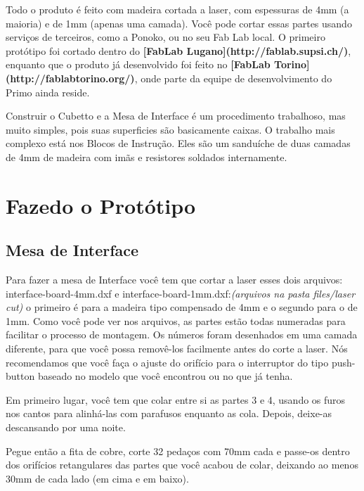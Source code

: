 \documentclass[paper=a4, fontsize=11pt]{scrartcl} %
\numberwithin{equation}{section} %
\numberwithin{figure}{section} %
\numberwithin{table}{section} %
\begin{document}
Todo o produto é feito com madeira cortada a laser, com espessuras de 4mm (a maioria) e de 1mm (apenas uma camada). Você pode cortar essas partes usando serviços de terceiros, como a Ponoko, ou no seu Fab Lab local. O primeiro protótipo foi cortado dentro do \textbf{[FabLab Lugano](http://fablab.supsi.ch/)}, enquanto que o produto já desenvolvido foi feito no \textbf{[FabLab Torino](http://fablabtorino.org/)}, onde parte da equipe de desenvolvimento do Primo ainda reside.

Construir o Cubetto e a Mesa de Interface é um procedimento trabalhoso, mas muito simples, pois suas superficies são basicamente caixas. O trabalho mais complexo está nos Blocos de Instrução. Eles são um sanduíche de duas camadas de 4mm de madeira com imãs e resistores soldados internamente.

\section{Fazedo o Protótipo}

\subsection{Mesa de Interface}

Para fazer a mesa de Interface você tem que cortar a laser esses dois arquivos: interface-board-4mm.dxf e interface-board-1mm.dxf:\textit{(arquivos na pasta files/laser cut)} o primeiro é para a madeira tipo compensado de 4mm e o segundo para o de 1mm. Como você pode ver nos arquivos, as partes estão todas numeradas para facilitar o processo de montagem. Os números foram desenhados em uma camada diferente, para que você possa removê-los facilmente antes do corte a laser. Nós recomendamos que você faça o ajuste do orifício para o interruptor do tipo push-button baseado no modelo que você encontrou ou no que já tenha.

Em primeiro lugar, você tem que colar entre si as partes 3 e 4, usando os furos nos cantos para alinhá-las com parafusos enquanto as cola. Depois, deixe-as descansando por uma noite.

Pegue então a fita de cobre, corte 32 pedaços com 70mm cada e passe-os dentro dos orifícios retangulares das partes que você acabou de colar, deixando ao menos 30mm de cada lado (em cima e em baixo).
\end{document}
